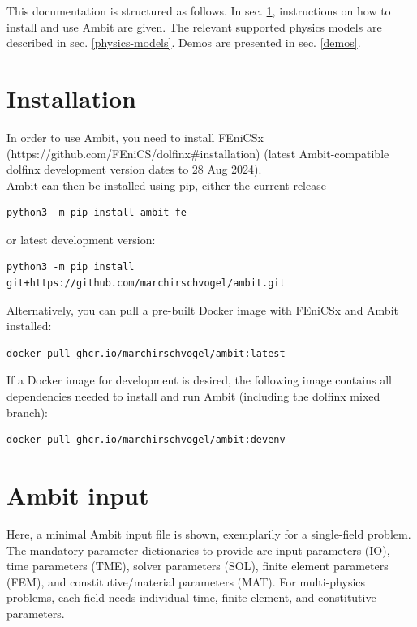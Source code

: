\documentclass[a4paper,12pt]{report}
\begin{document}
This documentation is structured as follows. In sec. \ref{installation}, instructions on how to install and use Ambit are given. The relevant supported physics models are described in sec. \ref{physics-models}. Demos are presented in sec. \ref{demos}.


\section{Installation}\label{installation}

In order to use Ambit, you need to install FEniCSx (https://github.com/FEniCS/dolfinx\#installation) (latest Ambit-compatible dolfinx development version dates to 28 Aug 2024).\\

Ambit can then be installed using pip, either the current release
\begin{verbatim}
python3 -m pip install ambit-fe
\end{verbatim}

or latest development version:
\begin{verbatim}
python3 -m pip install git+https://github.com/marchirschvogel/ambit.git
\end{verbatim}

Alternatively, you can pull a pre-built Docker image with FEniCSx and Ambit installed:
\begin{verbatim}
docker pull ghcr.io/marchirschvogel/ambit:latest
\end{verbatim}

If a Docker image for development is desired, the following image contains all dependencies needed to install and run Ambit (including the dolfinx mixed branch):
\begin{verbatim}
docker pull ghcr.io/marchirschvogel/ambit:devenv
\end{verbatim}

\section{Ambit input}

Here, a minimal Ambit input file is shown, exemplarily for a single-field problem. The mandatory parameter dictionaries to provide are input parameters (IO), time parameters (TME), solver parameters (SOL), finite element parameters (FEM), and constitutive/material parameters (MAT). For multi-physics problems, each field needs individual time, finite element, and constitutive parameters.
\end{document}
